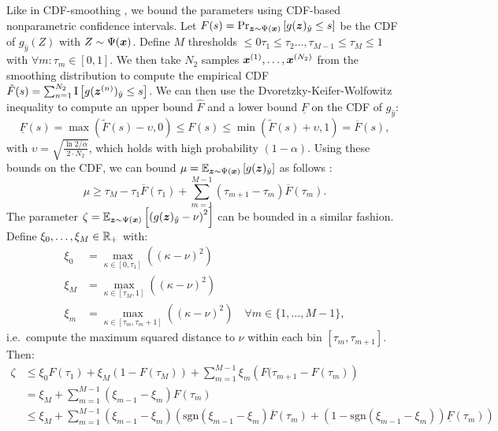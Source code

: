 Like in CDF-smoothing \citep{Kumar2020}, we bound the parameters using CDF-based nonparametric confidence intervals.
Let $F(s) = \Pr_{{\bm{z}} \sim \Psi({\bm{x}})}\left[g({\bm{z}})_{\hat{y}} \leq s\right]$ be the CDF  of $g_{\hat{y}}(Z)$ with $Z \sim \Psi({\bm{x}})$.
Define $M$ thresholds $\leq 0 \tau_1 \leq \tau_2 \dots, \tau_{M-1} \leq \tau_M \leq 1$ with $\forall m: \tau_m \in [0,1]$. We then take $N_2$ samples ${\bm{x}}^{(1)}, \dots, {\bm{x}}^{(N_2)}$ from the smoothing distribution to compute the empirical CDF $\tilde{F}(s) = \sum_{n=1}^{N_2} \mathrm{I}\left[g({\bm{z}}^{(n)})_{\hat{y}} \leq s\right]$.
We can then use the Dvoretzky-Keifer-Wolfowitz inequality \citep{Dvoretzky1956} to compute an upper bound $\hat{F}$ and a lower bound $\underline{F}$ on the CDF of $g_{\hat{y}}$:
\begin{equation}
   \underline{F}(s) = \max\left(\tilde{F}(s) - \upsilon, 0\right) \leq F(s) \leq 
   \min\left(\tilde{F}(s) + \upsilon, 1\right) = \overline{F}(s),
\end{equation}
with $\upsilon = \sqrt{\frac{\ln 2 / \alpha}{2 \cdot N_2}}$, which holds with high probability $(1 - \alpha)$.
Using these bounds on the CDF, we can bound $\mu = \mathbb{E}_{{\bm{z}} \sim \Psi({\bm{x}})}\left[g({\bm{z}})_{\hat{y}}\right]$ as follows \citep{Anderson1969}:
\begin{equation}
    \mu \geq \tau_M  - \tau_1 \overline{F}(\tau_1)+ \sum_{m=1}^{M-1} \left(\tau_{m+1} - \tau_{m}\right) \overline{F}(\tau_m).
\end{equation}
The parameter $\zeta = \mathbb{E}_{{\bm{z}} \sim \Psi({\bm{x}})}\left[\left(g({\bm{z}})_{\hat{y}} - \nu \right)^2\right]$ can be bounded in a similar fashion.
Define $\xi_0, \dots, \xi_M \in {\mathbb{R}}_+$ with:
\begin{equation}
\begin{split}
    \xi_0 & = \max_{\kappa \in [0, \tau_1]}  \left((\kappa - \nu)^2\right) \\
    \xi_M & = \max_{\kappa \in [\tau_M, 1]}  \left((\kappa - \nu)^2\right) \\
    \xi_m & = \max_{\kappa \in [\tau_m, \tau_m+1]}  \left((\kappa - \nu)^2\right) \quad \forall m \in \{1,\dots,M-1\},
\end{split}
\end{equation}
i.e.~compute the maximum squared distance to $\nu$ within each bin $[\tau_m, \tau_{m+1}]$. Then:
\begin{align}
    \zeta & \leq
    \xi_0 F(\tau_1)
    +
    \xi_M \left(1 - F(\tau_M)\right)
    +
    \sum_{m=1}^{M-1} \xi_m \left(F(\tau_{m+1} - F(\tau_m)\right) \\
   & = \xi_M
   +
    \sum_{m=1}^{M-1} \left(\xi_{m-1} -\xi_m\right)F(\tau_{m}) \\
   & \leq 
  \xi_M
   +
   \sum_{m=1}^{M-1} \left(\xi_{m-1} -\xi_m\right) \left(\mathrm{sgn}\left(\xi_{m-1} -\xi_m\right) \overline{F}(\tau_{m})
   +
   \left(1 - \mathrm{sgn}\left(\xi_{m-1} -\xi_m\right) \right) \underline{F}(\tau_{m})\right)
\end{align}

